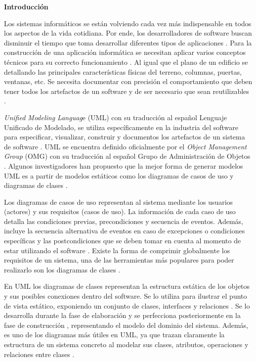 \begin{center}
	\textbf{ {\titulodc Introducción}}
\end{center}

Los sistemas informáticos se están volviendo cada vez más indispensable en todos los aspectos de la vida cotidiana. Por ende, los desarrolladores de software buscan disminuir el tiempo que toma desarrollar diferentes tipos de aplicaciones \parencite{Panthi2022}. Para la construcción de una aplicación informática se necesitan aplicar varios conceptos técnicos para su correcto funcionamiento \parencite{Chen2022}. Al igual que el plano de un edificio se detallando las principales características físicas del terreno, columnas, puertas, ventanas, etc. Se necesita documentar con precisión el comportamiento que deben tener todos los artefactos de un software y de ser necesario que sean reutilizables \parencite{Hamdi2022}.

\textit{Unified Modeling Languag}e (UML) con su traducción al español Lenguaje Unificado de Modelado, se utiliza específicamente en la industria del software para especificar, visualizar, construir y documentos los artefactos de un sistema de software \parencite{Bergstrom2022}. UML se encuentra definido oficialmente por el \textit{Object Management Group} (OMG) con su traducción al español Grupo de Administración de Objetos \parencite{Omg2009}. Algunos investigadores han propuesto que la mejor forma de generar modelos UML es a partir de modelos estáticos como los diagramas de casos de uso y diagramas de clases \parencite{Jahan2021}.

Los diagramas de casos de uso representan al sistema mediante los usuarios (actores) y sus requisitos (casos de uso). La información de cada caso de uso detalla las condiciones previas, precondiciones y secuencia de eventos. Además, incluye la secuencia alternativa de eventos en caso de excepciones o condiciones específicas y las postcondiciones que se deben tomar en cuenta al momento de estar utilizando el software \parencite{iqbal2020}. Existe la forma de comprimir globalmente los requisitos de un sistema, una de las herramientas más populares para poder realizarlo son los diagramas de clases \parencite{Abdelnabi2021}. 

En UML los diagramas de clases representan la estructura estática de los objetos y sus posibles conexiones dentro del software. Se lo utiliza para ilustrar el punto de vista estático, exponiendo un conjunto de clases, interfaces y relaciones \parencite{abu2020}. Se lo desarrolla durante la fase de elaboración y se perfecciona posteriormente en la fase de construcción \parencite{Omg2009}, representando el modelo del dominio del sistema. Además, es uno de los diagramas más útiles en UML, ya que trazan claramente la estructura de un sistema concreto al modelar sus clases, atributos, operaciones y relaciones entre clases \parencite{abu2020}.

